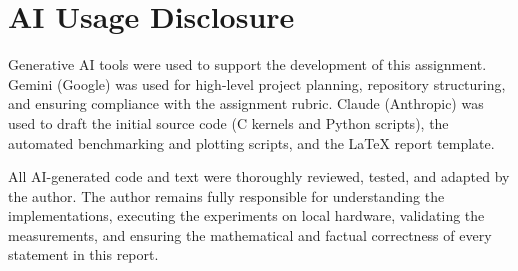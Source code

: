 \documentclass[conference,a4paper]{IEEEtran}
\begin{document}
\endgroup

\balance
\section*{AI Usage Disclosure}
Generative AI tools were used to support the development of this assignment. Gemini (Google) was used for high-level project planning, repository structuring, and ensuring compliance with the assignment rubric. Claude (Anthropic) was used to draft the initial source code (C kernels and Python scripts), the automated benchmarking and plotting scripts, and the LaTeX report template.

All AI-generated code and text were thoroughly reviewed, tested, and adapted by the author. The author remains fully responsible for understanding the implementations, executing the experiments on local hardware, validating the measurements, and ensuring the mathematical and factual correctness of every statement in this report.
\end{document}
